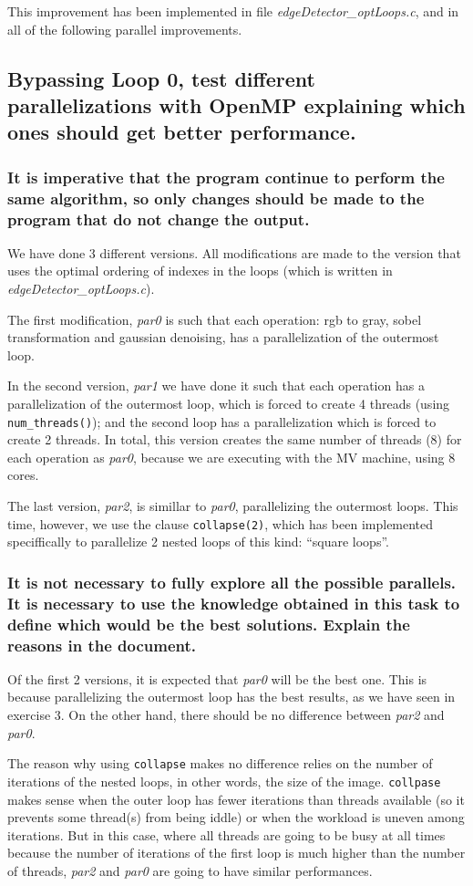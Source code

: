 \documentclass{article}
\newcommand{\question}[1]{\subsection{#1}}
\newcommand{\subquestion}[1]{\subsubsection{#1}}
\begin{document}
This improvement has been implemented in file \emph{edgeDetector\_optLoops.c}, and in all of the following parallel improvements.

\question{Bypassing Loop 0, test different parallelizations with OpenMP explaining which ones should get better performance.}

    \subquestion{It is imperative that the program continue to perform the same algorithm, so only changes should be made to the program that do not change the output.}
            
We have done 3 different versions. All modifications are made to the version that uses the optimal ordering of indexes in the loops (which is written in \emph{edgeDetector\_optLoops.c}).

The first modification, \emph{par0} is such that each operation: rgb to gray, sobel transformation and gaussian denoising, has a parallelization of the outermost loop.

In the second version, \emph{par1} we have done it such that each operation has a parallelization of the outermost loop, which is forced to create 4 threads (using \texttt{num\_threads()}); and the second loop has a parallelization which is forced to create 2 threads. In total, this version creates the same number of threads ($8$) for each operation as \emph{par0}, because we are executing with the MV machine, using 8 cores.

The last version, \emph{par2}, is simillar to \emph{par0}, parallelizing the outermost loops. This time, however, we use the clause \texttt{collapse(2)}, which has been implemented speciffically to parallelize 2 nested loops of this kind: ``square loops''.

    \subquestion{It is not necessary to fully explore all the possible parallels. It is necessary to use the knowledge obtained in this task to define which would be the best solutions. Explain the reasons in the
        document.}\label{question:expected}
Of the first 2 versions, it is expected that \emph{par0} will be the best one. This is because parallelizing the outermost loop has the best results, as we have seen in exercise 3.
On the other hand, there should be no difference between \emph{par2} and \emph{par0}.

The reason why using \texttt{collapse} makes no difference relies on the number of iterations of the nested loops, in other words, the size of the image. \texttt{collpase} makes sense when the outer loop has fewer iterations than threads available (so it prevents some thread(s) from being iddle) or when the workload is uneven among iterations. But in this case, where all threads are going to be busy at all times because the number of iterations of the first loop is much higher than the number of threads, \emph{par2} and \emph{par0} are going to have similar performances.
\end{document}
